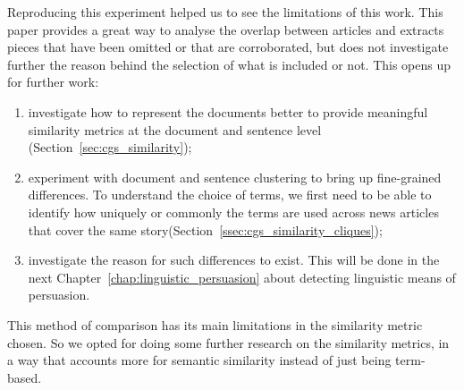 

Reproducing this experiment helped us to see the limitations of this work. %
This paper provides a great way to analyse the overlap between articles and extracts pieces that have been omitted or that are corroborated, but does not investigate further the reason behind the selection of what is included or not.
This opens up for further work:
\begin{enumerate}
    \item investigate how to represent the documents better to provide meaningful similarity metrics at the document and sentence level (Section~\ref{sec:cgs_similarity}); %
    \item experiment with document and sentence clustering to bring up fine-grained differences. To understand the choice of terms, we first need to be able to identify how uniquely or commonly the terms are used across news articles that cover the same story(Section~\ref{ssec:cgs_similarity_cliques}); %
    \item investigate the reason for such differences to exist. This will be done in the next Chapter~\ref{chap:linguistic_persuasion} about detecting linguistic means of persuasion.
\end{enumerate}

This method of comparison has its main limitations in the similarity metric chosen. So we opted for doing some further research on the similarity metrics, in a way that accounts more for semantic similarity instead of just being term-based.


